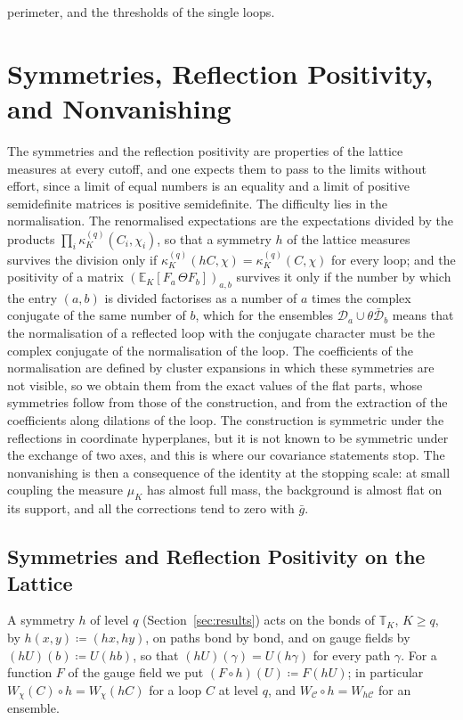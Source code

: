 \documentclass[11pt]{preprint}
\numberwithin{equation}{section}
\theoremstyle{definition}
\theoremstyle{remark}
\theoremstyle{plain}
\begin{document}
perimeter, and the thresholds of the single loops.

\section{Symmetries, Reflection Positivity, and Nonvanishing}\label{sec:reflection-positivity}

The symmetries and the reflection positivity are properties of the lattice measures at every cutoff, and one expects them to pass to the limits without effort, since a limit of equal numbers is an equality and a limit of positive semidefinite matrices is positive semidefinite. The difficulty lies in the normalisation. The renormalised expectations are the expectations divided by the products $\prod_i\kappa^{(q)}_K(C_i, \chi_i)$, so that a symmetry $h$ of the lattice measures survives the division only if $\kappa^{(q)}_K(hC, \chi) = \kappa^{(q)}_K(C, \chi)$ for every loop; and the positivity of a matrix $(\mathbb E_K[F_a\,\Theta F_b])_{a,b}$ survives it only if the number by which the entry $(a, b)$ is divided factorises as a number of $a$ times the complex conjugate of the same number of $b$, which for the ensembles $\mathcal D_a \cup \theta\bar{\mathcal D}_b$ means that the normalisation of a reflected loop with the conjugate character must be the complex conjugate of the normalisation of the loop. The coefficients of the normalisation are defined by cluster expansions in which these symmetries are not visible, so we obtain them from the exact values of the flat parts, whose symmetries follow from those of the construction, and from the extraction of the coefficients along dilations of the loop. The construction is symmetric under the reflections in coordinate hyperplanes, but it is not known to be symmetric under the exchange of two axes, and this is where our covariance statements stop. The nonvanishing is then a consequence of the identity at the stopping scale: at small coupling the measure $\mu_K$ has almost full mass, the background is almost flat on its support, and all the corrections tend to zero with $\bar g$.

\subsection{Symmetries and Reflection Positivity on the Lattice}\label{sec:lattice-reflection-positivity}

A symmetry $h$ of level $q$ (Section~\ref{sec:results}) acts on the bonds of $\mathbb T_K$, $K \geq q$, by $h(x, y) \coloneqq (hx, hy)$, on paths bond by bond, and on gauge fields by $(hU)(b) \coloneqq U(hb)$, so that $(hU)(\gamma) = U(h\gamma)$ for every path $\gamma$. For a function $F$ of the gauge field we put $(F \circ h)(U) \coloneqq F(hU)$; in particular $W_\chi(C) \circ h = W_\chi(hC)$ for a loop $C$ at level $q$, and $W_{\mathcal C} \circ h = W_{h\mathcal C}$ for an ensemble.
\end{document}
